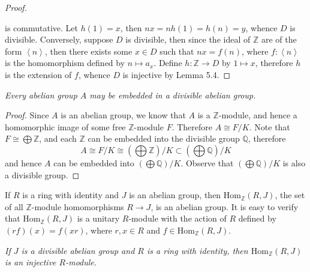 \begin{proof}
\begin{center}
\begin{tikzpicture}[x=0.75pt,y=0.75pt,yscale=-1,xscale=1]
\end{tikzpicture}
\end{center}
is commutative. Let $h(1)=x$, then $nx=nh(1)=h(n)=y$, whence $D$ is divisible. Conversely, suppose $D$ is divisible, then since the ideal of $\mathbb{Z}$ are of the form $\left<n\right>$, then there exists some $x\in D$ such that $nx=f(n)$, where $f:\left<n\right>$ is the homomorphism defined by $n\mapsto a_x$. Define $h:\mathbb{Z}\to D$ by $1\mapsto x$, therefore $h$ is the extension of $f$, whence $D$ is injective by Lemma 5.4.
\end{proof}
\begin{lemma}\em
Every abelian group $A$ may be embedded in a divisible abelian group.
\end{lemma}
\begin{proof}
Since $A$ is an abelian group, we know that $A$ is a $\mathbb{Z}$-module, and hence a homomorphic image of some free $\mathbb{Z}$-module $F$. Therefore $A\cong F/K$. Note that $F\cong\bigoplus\mathbb{Z}$, and each $\mathbb{Z}$ can be embedded into the divisible group $\mathbb{Q}$, therefore 
$$
A\cong F/K\cong \left( \bigoplus{\mathbb{Z}} \right) /K\subset \left( \bigoplus{\mathbb{Q}} \right) /K
$$
and hence $A$ can be embedded into $\left(\bigoplus\mathbb{Q}\right)/K$. Observe that $\left(\bigoplus\mathbb{Q}\right)/K$ is also a divisible group.
\end{proof}
If $R$ is a ring with identity and $J$ is an abelian group, then $\mathrm{Hom}_\mathbb{Z}(R,J)$, the set of all $\mathbb{Z}$-module homomorphisms $R\to J$, is an abelian group. It is easy to verify that $\mathrm{Hom}_\mathbb{Z}(R,J)$ is a unitary $R$-module with the action of $R$ defined by $(rf)(x)=f(xr)$, where $r,x\in R$ and $f\in\mathrm{Hom}_\mathbb{Z}(R,J)$.
\begin{lemma}\em
If $J$ is a divisible abelian group and $R$ is a ring with identity, then $\mathrm{Hom}_\mathbb{Z}(R,J)$ is an injective $R$-module.
\end{lemma}
